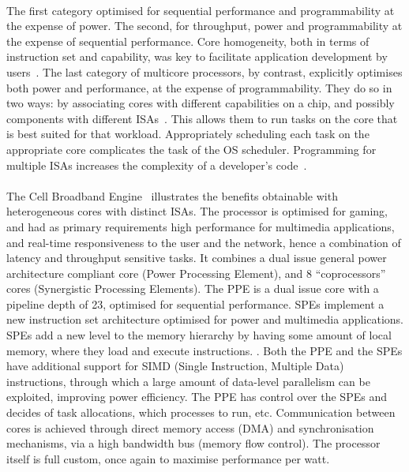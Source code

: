 \paragraph{} The first category optimised for 
sequential performance and programmability at the expense of power. The second, 
for throughput, power and programmability at the expense of sequential performance. 
Core homogeneity, both in terms of instruction set and capability,
was key to facilitate application development by users~\cite{balakrishnan2005impactperfasym}. The last category
of multicore processors, by contrast, explicitly optimises both
power and performance, at the expense of programmability. They do so in two ways: 
by associating cores with different capabilities on a chip, and possibly components
with different ISAs~\cite{kumar:2004:SHM:998680.1006707,5695539,Kumar:2005:HCM:1100859.1100890,FSSP:09}. This allows them to run tasks on the core
that is best suited for that workload. Appropriately scheduling each 
task on the appropriate core complicates the task of the OS scheduler.
Programming for multiple ISAs increases the complexity of a developer's code~\cite{McIlroy:2010:HRS:1869459.1869478}. 

\paragraph{} The Cell Broadband Engine~\cite{kahle2005cell} illustrates the benefits obtainable with heterogeneous
cores with distinct ISAs. The processor is optimised for gaming, and had as primary 
requirements high performance for multimedia applications, and real-time
responsiveness to the user and the network, hence a combination of 
latency and throughput sensitive tasks. It combines a dual 
issue general power architecture compliant core 
(Power Processing Element), and 8 ``coprocessors''
cores (Synergistic Processing Elements).  The PPE is a dual issue core with a 
pipeline depth of 23, optimised for sequential performance. SPEs implement a new instruction set architecture optimised for power and multimedia applications.
SPEs add a new level to the memory hierarchy by having some amount of local memory, where they load and execute instructions. . Both the PPE and the SPEs have
additional support for SIMD (Single Instruction, Multiple Data) instructions, through which a large amount of data-level parallelism can be exploited, improving power efficiency. The PPE has control over the SPEs and decides of task allocations, which processes to run, etc. Communication between cores is achieved 
through direct memory access (DMA) and synchronisation mechanisms, via a high bandwidth bus (memory flow control). The processor itself is full 
custom, once again to maximise performance per watt. 

